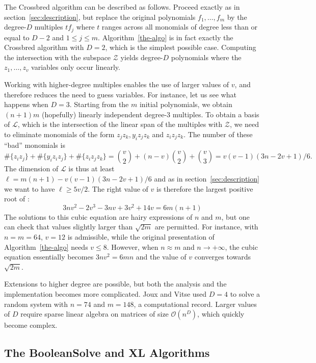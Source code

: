 \documentclass[a4paper,UKenglish,cleveref, autoref]{lipics-v2019}
\newcommand{\bigO}[1]{\ensuremath{\mathcal{O}\left( #1 \right)} }
\begin{document}
The \textsf{Crossbred} algorithm can be described as follows. Proceed exactly as
in section~\ref{sec:description}, but replace the original polynomials
$f_1, \dots, f_m$ by the degree-$D$ multiples $t f_j$ where $t$ ranges across
all monomials of degree less than or equal to $D-2$ and $1 \leq j \leq
m$. Algorithm~\ref{the-algo} is in fact exactly the \textsf{Crossbred} algorithm
with $D=2$, which is the simplest possible case. Computing the intersection with
the subspace $\mathcal{Z}$ yields degree-$D$ polynomials where the
$z_1, \dots, z_v$ variables only occur linearly.

Working with higher-degree multiples enables the use of larger values of $v$,
and therefore reduces the need to guess variables. For instance, let us see what
happens when $D=3$. Starting from the $m$ initial polynomials, we obtain
$(n+1)m$ (hopefully) linearly independent degree-3 multiples. To obtain a basis
of $\mathcal{L}$, which is the intersection of the linear span of the multiples
with $\mathcal{Z}$, we need to eliminate monomials of the form
$z_jz_k, y_iz_jz_k$ and $z_iz_jz_k$. The number of these ``bad'' monomials is
\[
  \#\{z_iz_j\} + \#\{y_iz_iz_j\} +\#\{z_iz_jz_k\} = \binom{v}{2} + (n-v)\binom{v}{2} +\binom{v}{3} = v(v - 1)(3n - 2v + 1) / 6.
\]
The dimension of $\mathcal{L}$ is thus at least
$\ell = m(n+1) - v(v - 1)(3n - 2v + 1) / 6$ and as in
section~\ref{sec:description} we want to have $\ell \geq 5v/2$. The right value
of $v$ is therefore the largest positive root of  :
\[
3nv^2 - 2v^3 - 3nv + 3v^2 + 14v = 6m(n+1)
\]
The solutions to this cubic equation are hairy expressions of $n$ and $m$, but
one can check that values slightly larger than $\sqrt{2m}$ are permitted. For
instance, with $n=m=64$, $v=12$ is admissible, while the original presentation
of Algorithm~\ref{the-algo} needs $v \leq 8$. However, when $n \approx m$ and
$n \rightarrow +\infty$, the cubic equation essentially becomes $3nv^2 = 6mn$
and the value of $v$ converges towards $\sqrt{2m}$.

Extensions to higher degree are possible, but both the analysis and the
implementation becomes more complicated. Joux and Vitse used $D=4$ to solve a
random system with $n=74$ and $m=148$, a computational record. Larger values of
$D$ require sparse linear algebra on matrices of size $\bigO{n^D}$, which
quickly become complex.


\subsection{The \textsf{BooleanSolve} and \textsf{XL} Algorithms}
\end{document}
